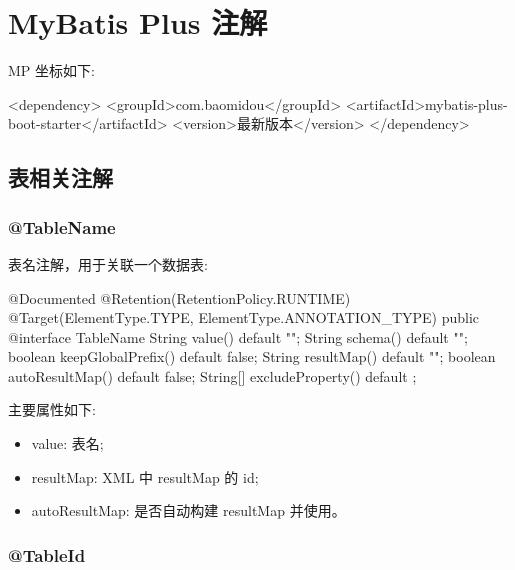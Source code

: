 \section{MyBatis Plus 注解}


MP 坐标如下:

\begin{xml}
<dependency>
    <groupId>com.baomidou</groupId>
    <artifactId>mybatis-plus-boot-starter</artifactId>
    <version>最新版本</version>
</dependency>
\end{xml}

\subsection{表相关注解}

\subsubsection{@TableName}

表名注解，用于关联一个数据表:

\begin{Java}
    @Documented
    @Retention(RetentionPolicy.RUNTIME)
    @Target({ElementType.TYPE, ElementType.ANNOTATION_TYPE})
    public @interface TableName {
        String value() default "";
        String schema() default "";
        boolean keepGlobalPrefix() default false;
        String resultMap() default "";
        boolean autoResultMap() default false;
        String[] excludeProperty() default {};
    }
\end{Java}

主要属性如下:
\begin{itemize}
    \item value: 表名;
    \item resultMap: XML 中 resultMap 的 id;
    \item autoResultMap: 是否自动构建 resultMap 并使用。
\end{itemize}

\subsubsection{@TableId}

